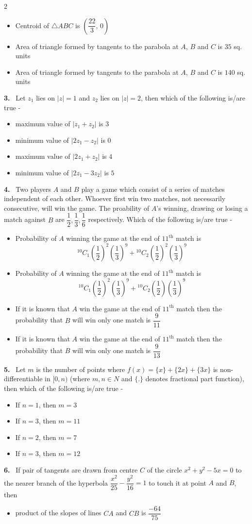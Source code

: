 \documentclass[10pt]{extarticle}
\newcommand{\qn}[1]{\par\smallskip\noindent\textbf{#1.}~}
\newenvironment{qoptions}{\begin{itemize}[leftmargin=1.8em,itemsep=1pt,topsep=2pt,label={}]}{\end{itemize}}
\newcommand{\opt}[2]{\item[(#1)] #2}
\begin{document}
\begin{multicols}{2}
\begin{qoptions}
\opt{B}{Centroid of $\triangle ABC$ is $\left(\dfrac{22}3,\,0\right)$}
\opt{C}{Area of triangle formed by tangents to the parabola at $A$, $B$ and $C$ is $35$ sq. units}
\opt{D}{Area of triangle formed by tangents to the parabola at $A$, $B$ and $C$ is $140$ sq. units}
\end{qoptions}
\qn{3} Let $z_1$ lies on $|z|=1$ and $z_2$ lies on $|z|=2$, then which of the following is/are true -
\begin{qoptions}
\opt{A}{maximum value of $|z_1+z_2|$ is $3$}
\opt{B}{minimum value of $|2z_1-z_2|$ is $0$}
\opt{C}{maximum value of $|2z_1+z_2|$ is $4$}
\opt{D}{minimum value of $|2z_1-3z_2|$ is $5$}
\end{qoptions}
\qn{4} Two players $A$ and $B$ play a game which consist of a series of matches independent of each other. Whoever first win two matches, not necessarily consecutive, will win the game. The proability of $A$'s winning, drawing or losing a match against $B$ are $\dfrac12,\dfrac13,\dfrac16$ respectively. Which of the following is/are true -
\begin{qoptions}
\opt{A}{Probability of $A$ winning the game at the end of $11^{\text{th}}$ match is
\[{}^{10}C_1\left(\frac12\right)^2\left(\frac13\right)^9+{}^{10}C_2\left(\frac12\right)^2\left(\frac13\right)^9\]}
\opt{B}{Probability of $A$ winning the game at the end of $11^{\text{th}}$ match is
\[{}^{10}C_1\left(\frac12\right)^2\left(\frac13\right)^9+{}^{10}C_2\left(\frac12\right)\left(\frac13\right)^9\]}
\opt{C}{If it is known that $A$ win the game at the end of $11^{\text{th}}$ match then the probability that $B$ will win only one match is $\dfrac9{11}$}
\opt{D}{If it is known that $A$ win the game at the end of $11^{\text{th}}$ match then the probability that $B$ will win only one match is $\dfrac9{13}$}
\end{qoptions}
\qn{5} Let $m$ is the number of points where $f(x)=\{x\}+\{2x\}+\{3x\}$ is non-differentiable in $[0,n)$ (where $m,n\in N$ and $\{.\}$ denotes fractional part function), then which of the following is/are true -
\begin{qoptions}
\opt{A}{If $n=1$, then $m=3$}
\opt{B}{If $n=3$, then $m=11$}
\opt{C}{If $n=2$, then $m=7$}
\opt{D}{If $n=3$, then $m=12$}
\end{qoptions}
\qn{6} If pair of tangents are drawn from centre $C$ of the circle $x^2+y^2-5x=0$ to the nearer branch of the hyperbola $\dfrac{x^2}{25}-\dfrac{y^2}{16}=1$ to touch it at point $A$ and $B$, then
\begin{qoptions}
\opt{A}{product of the slopes of lines $CA$ and $CB$ is $\dfrac{-64}{75}$}

\end{qoptions}
\end{multicols}
\end{document}
